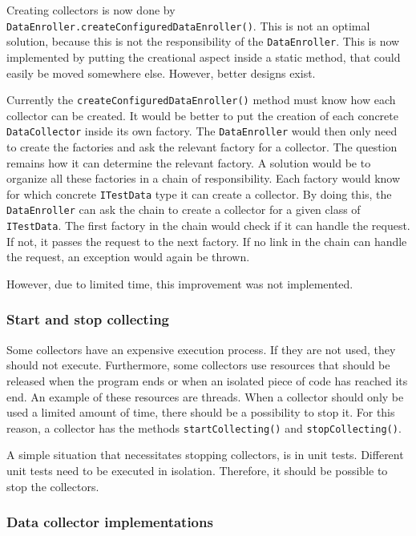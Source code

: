 \documentclass[i2]{oss}
\newcommand{\class}[1]{\texttt{#1}}
\newcommand{\method}[1]{\texttt{#1}}
\begin{document}
Creating collectors is now done by \method{DataEnroller.createConfiguredDataEnroller()}.
This is not an optimal solution, because this is not the responsibility of the \class{DataEnroller}.
This is now implemented by putting the creational aspect inside a static method, that could easily be moved somewhere else.
However, better designs exist.

Currently the \method{createConfiguredDataEnroller()} method must know how each collector can be created.
It would be better to put the creation of each concrete \class{DataCollector} inside its own factory.
The \class{DataEnroller} would then only need to create the factories and ask the relevant factory for a collector.
The question remains how it can determine the relevant factory.
A solution would be to organize all these factories in a chain of responsibility.
Each factory would know for which concrete \class{ITestData} type it can create a collector.
By doing this, the \class{DataEnroller} can ask the chain to create a collector for a given class of \class{ITestData}.
The first factory in the chain would check if it can handle the request.
If not, it passes the request to the next factory.
If no link in the chain can handle the request, an exception would again be thrown.

However, due to limited time, this improvement was not implemented.

\subsubsection{Start and stop collecting}

Some collectors have an expensive execution process.
If they are not used, they should not execute.
Furthermore, some collectors use resources that should be released when the program ends or when an isolated piece of code has reached its end.
An example of these resources are threads.
When a collector should only be used a limited amount of time, there should be a possibility to stop it.
For this reason, a collector has the methods \method{startCollecting()} and \method{stopCollecting()}.

A simple situation that necessitates stopping collectors, is in unit tests.
Different unit tests need to be executed in isolation. 
Therefore, it should be possible to stop the collectors.

\subsubsection{Data collector implementations}
\end{document}
